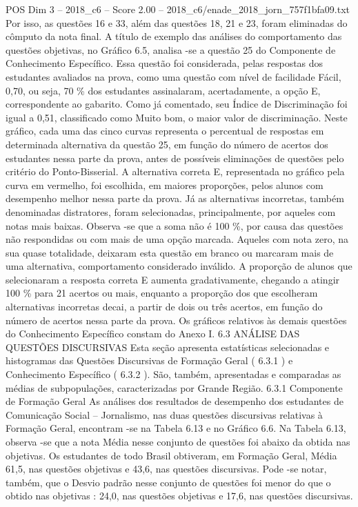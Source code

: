 \begin{textsample}{POS Dim 3 – 2018\_c6 – Score 2.00 – 2018\_c6/enade\_2018\_jorn\_757f1bfa09.txt}
Por isso, as questões 16 e 33, além das questões 18, 21 e 23, foram eliminadas do cômputo da nota final.
A título de exemplo das análises do comportamento das questões objetivas, no Gráfico 6.5, analisa -se a questão 25 do Componente de Conhecimento Específico.
Essa questão foi considerada, pelas respostas dos estudantes avaliados na prova, como uma questão com nível de facilidade Fácil, 0,70, ou seja, 70 \% dos estudantes assinalaram, acertadamente, a opção E, correspondente ao gabarito.
Como já comentado, seu Índice de Discriminação foi igual a 0,51, classificado como Muito bom, o maior valor de discriminação.
Neste gráfico, cada uma das cinco curvas representa o percentual de respostas em determinada alternativa da questão 25, em função do número de acertos dos estudantes nessa parte da prova, antes de possíveis eliminações de questões pelo critério do Ponto-Bisserial.
A alternativa correta E, representada no gráfico pela curva em vermelho, foi escolhida, em maiores proporções, pelos alunos com desempenho melhor nessa parte da prova.
Já as alternativas incorretas, também denominadas distratores, foram selecionadas, principalmente, por aqueles com notas mais baixas.
Observa -se que a soma não é 100 \%, por causa das questões não respondidas ou com mais de uma opção marcada.
Aqueles com nota zero, na sua quase totalidade, deixaram esta questão em branco ou marcaram mais de uma alternativa, comportamento considerado inválido.
A proporção de alunos que selecionaram a resposta correta E aumenta gradativamente, chegando a atingir 100 \% para 21 acertos ou mais, enquanto a proporção dos que escolheram alternativas incorretas decai, a partir de dois ou três acertos, em função do número de acertos nessa parte da prova.
Os gráficos relativos às demais questões do Conhecimento Específico constam do Anexo I. 6.3 ANÁLISE DAS QUESTÕES DISCURSIVAS Esta seção apresenta estatísticas selecionadas e histogramas das Questões Discursivas de Formação Geral ( 6.3.1 ) e Conhecimento Específico ( 6.3.2 ).
São, também, apresentadas e comparadas as médias de subpopulações, caracterizadas por Grande Região. 6.3.1 Componente de Formação Geral As análises dos resultados de desempenho dos estudantes de Comunicação Social – Jornalismo, nas duas questões discursivas relativas à Formação Geral, encontram -se na Tabela 6.13 e no Gráfico 6.6.
Na Tabela 6.13, observa -se que a nota Média nesse conjunto de questões foi abaixo da obtida nas objetivas.
Os estudantes de todo Brasil obtiveram, em Formação Geral, Média 61,5, nas questões objetivas e 43,6, nas questões discursivas.
Pode -se notar, também, que o Desvio padrão nesse conjunto de questões foi menor do que o obtido nas objetivas : 24,0, nas questões objetivas e 17,6, nas questões discursivas.

\end{textsample}
